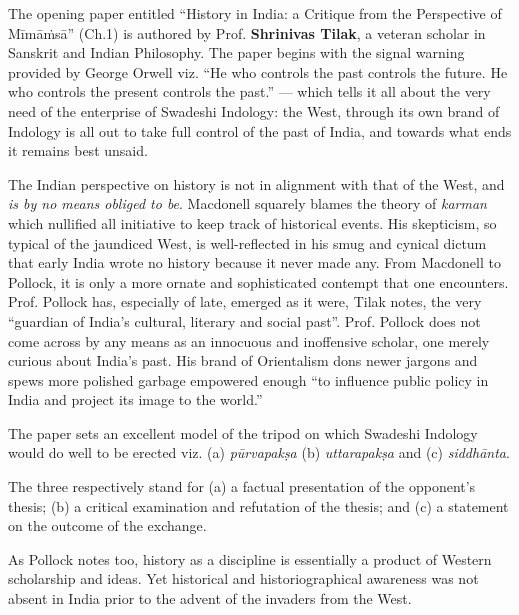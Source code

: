 The opening paper entitled “History in India: a Critique from the Perspective of Mīmāṁsā” (Ch.1) is authored by Prof. \textbf{Shrinivas Tilak}, a veteran scholar in Sanskrit and Indian Philosophy. The paper begins with the signal warning provided by George Orwell viz. “He who controls the past controls the future. He who controls the present controls the past.” — which tells it all about the very need of the enterprise of Swadeshi Indology: the West, through its own brand of Indology is all out to take full control of the past of India, and towards what ends it remains best unsaid. 

The Indian perspective on history is not in alignment with that of the West, and \textit{is by no means obliged to be}. Macdonell squarely blames the theory of \textit{karman} which nullified all initiative to keep track of historical events. His skepticism, so typical of the jaundiced West, is well-reflected in his smug and cynical dictum that early India wrote no history because it never made any. From Macdonell to Pollock, it is only a more ornate and sophisticated contempt that one encounters. Prof. Pollock has, especially of late, emerged as it were, Tilak notes, the very ``guardian of India’s cultural, literary and social past”. Prof. Pollock does not come across by any means as an innocuous and inoffensive scholar, one merely curious about India’s past. His brand of Orientalism dons newer jargons and spews more polished garbage empowered enough “to influence public policy in India and project its image to the world.”

The paper sets an excellent model of the tripod on which Swadeshi Indology would do well to be erected viz. (a) \textit{pūrvapakṣa} (b) \textit{uttarapakṣa} and (c) \textit{siddhānta}.

The three respectively stand for (a) a factual presentation of the opponent’s thesis; (b) a critical examination and refutation of the thesis; and (c) a statement on the outcome of the exchange. 

As Pollock notes too, history as a discipline is essentially a product of Western scholarship and ideas. Yet historical and historiographical awareness was not absent in India prior to the advent of the invaders from the West.

\newpage

